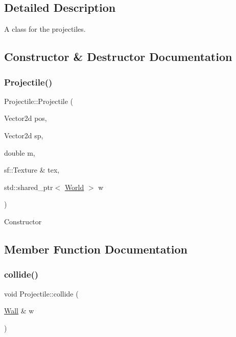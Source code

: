\subsection{Detailed Description}
A class for the projectiles. 

\subsection{Constructor \& Destructor Documentation}
\hypertarget{classProjectile_a2ac17690fe70259fee93ec2d9be115d3}{}\label{classProjectile_a2ac17690fe70259fee93ec2d9be115d3} 
\subsubsection{\texorpdfstring{Projectile()}{Projectile()}}
{\footnotesize\ttfamily Projectile\+::\+Projectile (\begin{DoxyParamCaption}\item[{Vector2d}]{pos,  }\item[{Vector2d}]{sp,  }\item[{double}]{m,  }\item[{sf\+::\+Texture \&}]{tex,  }\item[{std\+::shared\+\_\+ptr$<$ \hyperlink{classWorld}{World} $>$}]{w }\end{DoxyParamCaption})}

Constructor 

\subsection{Member Function Documentation}
\hypertarget{classProjectile_abfd30c4ad89a47b267e269b9b6ab1300}{}\label{classProjectile_abfd30c4ad89a47b267e269b9b6ab1300} 
\subsubsection{\texorpdfstring{collide()}{collide()}\hspace{0.1cm}{\footnotesize\ttfamily [1/2]}}
{\footnotesize\ttfamily void Projectile\+::collide (\begin{DoxyParamCaption}\item[{\hyperlink{classWall}{Wall} \&}]{w }\end{DoxyParamCaption})}

